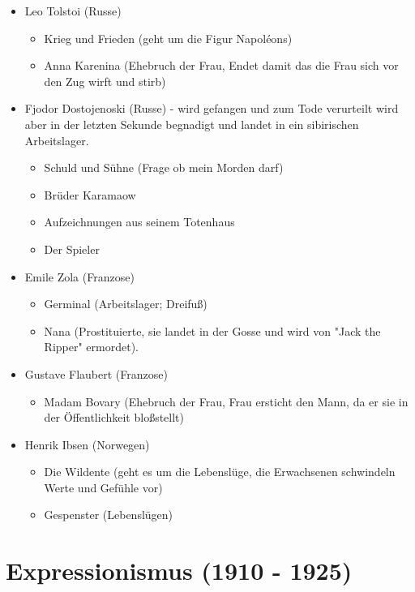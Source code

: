 \documentclass[12pt,a4paper]{article}
\begin{document}
\begin{itemize}
\item Leo Tolstoi (Russe)
	\begin{itemize}
	\item Krieg und Frieden (geht um die Figur Napoléons)
	\item Anna Karenina (Ehebruch der Frau, Endet damit das die Frau sich vor den Zug wirft und stirb)
	\end{itemize}
	
\item Fjodor Dostojenoski (Russe) - wird gefangen und zum Tode verurteilt wird aber in der letzten Sekunde begnadigt und landet in ein sibirischen Arbeitslager.
	\begin{itemize}
	\item Schuld und Sühne (Frage ob mein Morden darf)
	\item Brüder Karamaow 
	\item Aufzeichnungen aus seinem Totenhaus
	\item Der Spieler
	\end{itemize}
	
\item Emile Zola (Franzose)	
	\begin{itemize}
	\item Germinal (Arbeitslager; Dreifuß)
	\item Nana (Prostituierte, sie landet in der Gosse und wird von "Jack the Ripper" ermordet).
	\end{itemize}
	
\item Gustave Flaubert (Franzose)
	\begin{itemize}
	\item Madam Bovary (Ehebruch der Frau, Frau ersticht den Mann, da er sie in der Öffentlichkeit bloßstellt)
	\end{itemize}
	
\item Henrik Ibsen (Norwegen)
	\begin{itemize}
	\item Die Wildente (geht es um die Lebenslüge, die Erwachsenen schwindeln Werte und Gefühle vor)
	\item Gespenster (Lebenslügen)
	\end{itemize}		
	
\end{itemize}

\newpage

\section{Expressionismus (1910 - 1925)}
\end{document}
